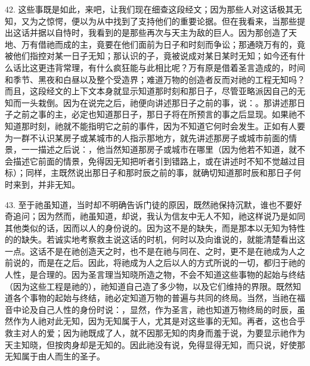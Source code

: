 42. 这些事既是如此，来吧，让我们现在细查这段经文；因为那些人对这话极其无知，又为之惊愕，便以为从中找到了支持他们的重要论据。但在我看来，当那些提出这话并据以自恃时，我看到的是那些再次与天主为敌的巨人。因为那创造了天地、万有借祂而成的主，竟要在他们面前为日子和时刻而争讼；那通晓万有的，竟被他们指控对某一日子无知；那认识的子，竟被说成对某日某时无知；如今还有什么话比这更违背常理，有什么疯狂能与此相比呢？万有原是借着圣言造成的，时间和季节、黑夜和白昼以及整个受造界；难道万物的创造者反而对祂的工程无知吗？而且，这段经文的上下文本身就显示知道那时刻和那日子，尽管亚略派因自己的无知而一头栽倒。因为在说完之后，祂便向讲述那日子之前的事，说：。那讲述那日子之前之事的主，必定也知道那日子，那日子将在所预言的事之后显现。如果祂不知道那时刻，祂就不能指明它之前的事件，因为不知道它何时会发生。正如有人要为一群不认识某房子或某城市的人指示那地方，就先讲述那房子或城市前面的情景，一一描述之后说：，他当然知道那房子或城市在哪里（因为他若不知道，就不会描述它前面的情景，免得因无知把听者引到错路上，或在讲述时不知不觉越过目标）；同样，主既然说出那日子和那时辰之前的事，就确切知道那时辰和那日子何时来到，并非无知。\par

43. 至于祂虽知道，当时却不明确告诉门徒的原因，既然祂保持沉默，谁也不要好奇追问；因为然而，祂虽知道，却说，我认为信友中无人不知，祂这样说乃是如同其他类似的话，因而以人的身份说的。因为这不是的缺失，而是那本以无知为特性的的缺失。若诚实地考察救主说这话的时机，何时以及向谁说的，就能清楚看出这一点。这话不是在祂创造天之时，也不是在祂与同在、之时，更不是在祂成为人之前说的，而是在之后。因此，将祂成为人之后以人的方式所说的一切，都归于祂的人性，是合理的。因为圣言理当知晓所造之物，不会不知道这些事物的起始与终结（因为这些工程是祂的），祂知道自己造了多少物，以及它们维持的界限。既然知道各个事物的起始与终结，祂必定知道万物的普遍与共同的终局。当然，当祂在福音中论及自己人性的身份时说：，显然，作为圣言，祂也知道万物终局的时辰，虽然作为人祂对此无知，因为无知属于人，尤其是对这些事的无知。再者，这也合乎救主对人的爱；因为祂既成了人，就不因那无知的肉身而羞于说，为要显示祂作为天主知晓，但按肉身却是无知的。因此祂没有说，免得显得无知，而只说，好使那无知属于由人而生的圣子。\par

